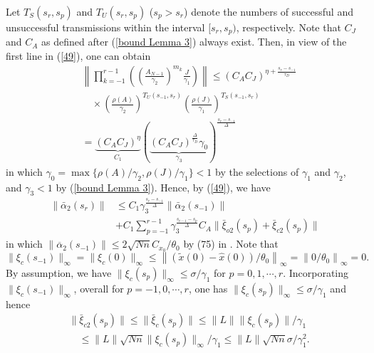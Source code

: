 \documentclass[letterpaper,journal,final,twocolumn]{IEEEtran}
\begin{document}
Let $T_S(s_r, s_p)$ and $T_U(s_r, s_p)$ ($s_p>s_r$) denote the numbers 
of successful and unsuccessful transmissions within
the interval $[s_r, s_p)$, respectively. 
Note that $C_J$ and $C_A$ as defined after (\ref{bound Lemma 3}) always exist.
Then, in view of the first line in (\ref{49}), one can obtain
\begin{align}\label{47}
&\left\| \prod_{k=-1}^{r-1} \left(\left(\frac{A_{N-1}}{\gamma_2}\right)^{m_k} \frac{J}{\gamma_1}\right) \right\| 
\le (C_A C_{J})^{\eta + \frac{s_r-s_{-1}}{\tau_D}}  \nonumber\\
&\quad \times\left(\frac{\rho(A)}{\gamma_2}\right)^{  T_U(s_{-1},s_r)}\left(\frac{\rho(J)}{\gamma_1}\right)^{  T_S(s_{-1},s_r)} \nonumber\\
&= \underbrace{(C_A C_{J})^\eta}_{C_1} (\underbrace{(C_AC_{J})^{\frac{\Delta}{\tau_D}}\gamma_{0}}_{\gamma_{3}})^{\frac{s_r-s_{-1}}{\Delta}}
\end{align}
in which $\gamma_{0}=\max \{\rho(A)/\gamma_2, \rho(J)/\gamma_1\}<1$ by the selections of $\gamma_1$ and $\gamma_2$, and $\gamma_3<1$ by (\ref{bound Lemma 3}).
Hence, by (\ref{49}), we have
\begin{align}\label{B9}
\|\bar \alpha_2(s_r)\| 
&\le C_1 \gamma_{3} ^{  \frac{s_r- s_{-1}}{\Delta}}  \| \bar \alpha_2(s_{-1}) \| \nonumber\\
&+ C_1 \sum_{p=-1}^{r-1} \gamma_{3} ^{\frac{s_{r-1} - s_{p}}{\Delta}} C_{A}\| \bar  \xi_{o2}(s_{p}) +   \bar  \xi_{c2}(s_{p}) \|
\end{align}
in which
$
\|\overline \alpha_2 (s_{-1}) \| \le   2\sqrt{Nn}  C_{x_0}/\theta_0
$
by (75) in \cite{feng2020arxiv}.
Note that
$
\|\xi_c(s_{-1})\|_\infty 
= 
\|\xi_c(0)\|_\infty 
\le \left\|    (\tilde  x(0) - \hat x(0))/\theta_0   \right\|_\infty 
= \left\|    0/\theta_0    \right\|_\infty =0.
$
By assumption, we have $\|\xi_c (s_p)\|_\infty \le \sigma/\gamma_1 $ for $p=0, 1, \cdots, r$. Incorporating $\|\xi_c(s_{-1})\|_\infty$, overall for $p=-1, 0, \cdots, r$, one has 
$
\|\xi_c (s_p)\|_\infty \le \sigma/\gamma_1
$
and hence
\begin{align}\label{50}
&\|\bar \xi_{c2} (s_p)\| \le  \|\bar \xi_c(s_p) \| \le \|L\| \|\xi_c(s_p)\| / \gamma_1  \nonumber\\
   & \quad 
  \le \|L\| \sqrt{Nn} \|\xi_c(s_p)\|_\infty / \gamma_1 \le \|L\| \sqrt{Nn} \sigma /\gamma_1^2.
\end{align}
\end{document}
